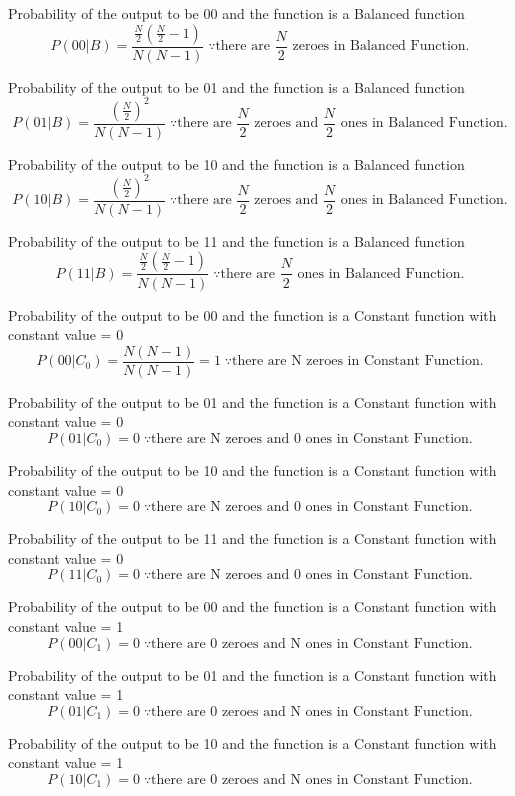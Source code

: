 \documentclass[11pt, a4paper]{article}
\begin{document}
Probability of the output to be 00 and the function is a Balanced function
\[
    \boxed{P(00|B) = \frac{\frac{N}{2}\left(\frac{N}{2}-1\right)}{N(N-1)}} \; \because\text{there are \(\frac{N}{2}\) zeroes in Balanced Function.}
\]

Probability of the output to be 01 and the function is a Balanced function
\[
    \boxed{P(01|B) = \frac{\left(\frac{N}{2}\right)^2}{N(N-1)}} \; \because\text{there are \(\frac{N}{2}\) zeroes and  \(\frac{N}{2}\) ones in Balanced Function.}
\]

Probability of the output to be 10 and the function is a Balanced function
\[
    \boxed{P(10|B) = \frac{\left(\frac{N}{2}\right)^2}{N(N-1)}} \; \because\text{there are \(\frac{N}{2}\) zeroes and  \(\frac{N}{2}\) ones in Balanced Function.}
\]

Probability of the output to be 11 and the function is a Balanced function
\[
    \boxed{P(11|B) = \frac{\frac{N}{2}\left(\frac{N}{2}-1\right)}{N(N-1)}} \; \because\text{there are \(\frac{N}{2}\) ones in Balanced Function.}
\]


Probability of the output to be 00 and the function is a Constant function with constant value = 0
\[
    \boxed{P(00|C_0) = \frac{N(N-1)}{N(N-1)}=1} \; \because\text{there are N zeroes in Constant Function.}
\]

Probability of the output to be 01 and the function is a Constant function with constant value = 0
\[
    \boxed{P(01|C_0) = 0} \; \because\text{there are N zeroes and 0 ones in Constant Function.}
\]

Probability of the output to be 10 and the function is a Constant function with constant value = 0
\[
    \boxed{P(10|C_0) = 0} \; \because\text{there are N zeroes and 0 ones in Constant Function.}
\]

Probability of the output to be 11 and the function is a Constant function with constant value = 0
\[
    \boxed{P(11|C_0) = 0} \; \because\text{there are N zeroes and 0 ones in Constant Function.}
\]


Probability of the output to be 00 and the function is a Constant function with constant value = 1
\[
    \boxed{P(00|C_1) = 0} \; \because\text{there are 0 zeroes and N ones in Constant Function.}
\]

Probability of the output to be 01 and the function is a Constant function with constant value = 1
\[
    \boxed{P(01|C_1) = 0} \; \because\text{there are 0 zeroes and N ones in Constant Function.}
\]

Probability of the output to be 10 and the function is a Constant function with constant value = 1
\[
    \boxed{P(10|C_1) = 0} \; \because\text{there are 0 zeroes and N ones in Constant Function.}
\]
\end{document}
